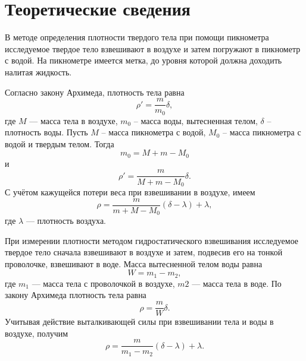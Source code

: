 \section{Теоретические сведения}

В методе определения плотности твердого тела при помощи пикнометра исследуемое твердое тело взвешивают в воздухе и затем погружают в пикнометр с водой. На пикнометре имеется метка, до уровня которой должна доходить налитая жидкость.

Согласно закону Архимеда, плотность тела равна
\[
\rho'=\frac{m}{m_0}\delta,
\]
где $M$ --- масса тела в воздухе, $m_0$ – масса воды, вытесненная телом, $\delta$ – плотность воды. Пусть $M$ – масса пикнометра с водой, $M_0$ – масса пикнометра с водой и твердым телом. Тогда
\[
m_0=M+m-M_0
\]
и
\[
\rho'=\frac{m}{M+m-M_0}\delta.
\]
С учётом кажущейся потери веса при взвешивании в воздухе, имеем
\begin{equation}\label{eq:1}
\rho=\frac{m}{m+M-M_0}(\delta-\lambda)+\lambda,
\end{equation}
где $\lambda$ --- плотность воздуха.

При измерении плотности методом гидростатического взвешивания исследуемое твердое тело сначала взвешивают в воздухе и затем, подвесив его на тонкой проволочке, взвешивают в воде. Масса вытесненной телом воды равна
\[
W=m_1-m_2,
\]
где $m_1$ --- масса тела с проволочкой в воздухе, $m2$ --- масса тела в воде. По закону Архимеда плотность тела равна
\[
\rho=\frac{m}{W}\delta.
\]
Учитывая действие выталкивающей силы при взвешивании тела и воды в воздухе, получим
\begin{equation}\label{eq:2}
\rho=\frac{m}{m_1-m_2}(\delta-\lambda)+\lambda.
\end{equation}